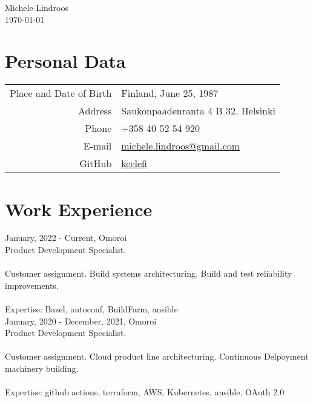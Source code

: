 \documentclass[12pt]{article}
\begin{document}

\begin{center}
\Huge{Michele Lindroos} \\
\normalsize{\today}
\end{center}


\section*{Personal Data}
\begin{tabular}{rl}
Place and Date of Birth & Finland, June 25, 1987\\
Address & Saukonpaadenranta 4 B 32, Helsinki\\
Phone & +358 40 52 54 920\\
E-mail & \href{mailto:michele.lindroos@gmail.com}{michele.lindroos@gmail.com}\\
GitHub & \href{https://github.com/keelefi}{keelefi}
\end{tabular}


\section*{Work Experience}

\large{January, 2022 - Current, Omoroi}\\
\normalsize{Product Development Specialist.}\\
\\
\normalsize{Customer assignment. Build systems architecturing. Build and test reliability improvements.}\\
\\
\normalsize{Expertise: Bazel, autoconf, BuildFarm, ansible}\\

\large{January, 2020 - December, 2021, Omoroi}\\
\normalsize{Product Development Specialist.}\\
\\
\normalsize{Customer assignment. Cloud product line architecturing. Continuous Delpoyment machinery building.}\\
\\
\normalsize{Expertise: github actions, terraform, AWS, Kubernetes, ansible, OAuth 2.0}\\
\end{document}
